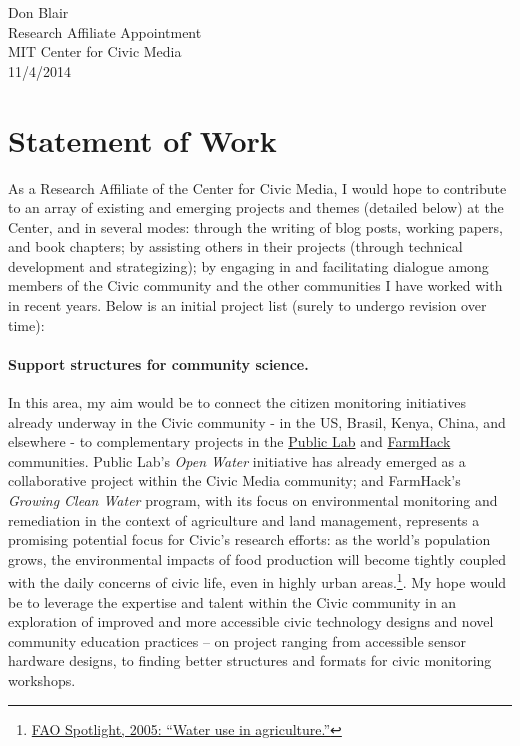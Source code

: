 \documentclass[10pt]{article}
\begin{document}
\setlength\parindent{0pt}

Don Blair\\
Research Affiliate Appointment \\
MIT Center for Civic Media \\
11/4/2014


\section*{Statement of Work}


As a Research Affiliate of the Center for Civic Media, I would hope to contribute to an array of existing and emerging projects and themes (detailed below) at the Center, and in several modes: through the writing of blog posts, working papers, and book chapters; by assisting others in their projects (through technical development and strategizing); by engaging in and facilitating dialogue among members of the Civic community and the other communities I have worked with in recent years.  Below is an initial project list  (surely to undergo revision over time):

\paragraph{Support structures for community science.} In this area, my aim would be to connect the citizen monitoring initiatives already underway in the Civic community - in the US, Brasil, Kenya, China, and elsewhere -  to complementary projects in the \href{http://publiclab.org}{Public Lab} and \href{http://FarmHack}{FarmHack} communities.  
Public Lab's \emph{Open Water} initiative has already emerged as a collaborative project within the Civic Media community; and 
FarmHack's \emph{Growing Clean Water} program, with its focus on environmental monitoring and remediation in the context of agriculture and land management, 
  represents a promising potential focus for Civic's research efforts: as the world's population grows, the environmental impacts of food production will become tightly coupled with the daily concerns of civic life, even in highly urban areas.\footnote{\href{http://www.fao.org/ag/magazine/0511sp2.htm}{FAO Spotlight, 2005:  ``Water use in agriculture.''}}.  My hope would be to leverage the expertise and talent within the Civic community in an exploration of improved and more accessible civic technology designs and novel community education practices -- on project ranging from accessible sensor hardware designs, to finding better structures and formats for civic monitoring workshops.
\end{document}

